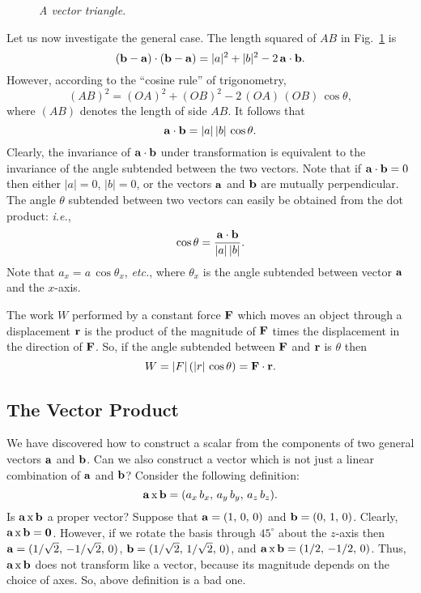\begin{figure}[h]
\epsfysize=1.75in
\centerline{}
\caption{\em A vector triangle.}\label{f5}
\end{figure}
Let us now investigate the general case. The length squared of $AB$ in Fig.~\ref{f5} is
\begin{equation}
({\bf b} - {\bf a} ) \cdot ({\bf b} - {\bf a} ) = |a|^2 + |b|^2 - 2\,{\bf a} \cdot
{\bf b}.
\end{equation}
However, according to the ``cosine rule'' of trigonometry,
\begin{equation}
(AB)^2 = (OA)^2 + (OB)^2 - 2 \,(OA)\,(OB)\,\cos\theta,
\end{equation}
where $(AB)$ denotes the length of side $AB$. It follows that
\begin{equation}
{\bf a} \cdot {\bf b} = |a|\, |b|\, \cos\theta.
\end{equation}
Clearly, the invariance of ${\bf a} \cdot {\bf b}$ under transformation is equivalent
to the invariance of the angle subtended between the two vectors. Note that
if ${\bf a} \cdot {\bf b} =0$ then either $|a|=0$, $|b|=0$, or the vectors
$\bf a$ and $\bf b$ are mutually perpendicular. The angle $\theta$ subtended between two vectors
can easily be obtained from the dot product: {\em i.e.}, 
\begin{equation}
\cos\theta = \frac{{\bf a} \cdot {\bf b}}{|a| \,|b| }.
\end{equation}
Note that $a_x=a\,\cos\theta_x$, {\em etc.}, where $\theta_x$ is
the angle subtended between vector ${\bf a}$ and the $x$-axis.

The work $W$ performed by a constant force $\bf F$ which moves an object through a displacement $\bf r$
is the product of the magnitude of $\bf F$ times the displacement in the direction
of $\bf F$. So, if the angle subtended between  $\bf F$ and $\bf r$ is $\theta$ then
\begin{equation}\label{e2.26}
W = |F| \,(|r|\,\cos\theta) = {\bf F}\cdot {\bf r}.
\end{equation}

\subsection{The Vector Product}
We have discovered how to construct a scalar from the components of two
general vectors $\bf a$ and $\bf b$. Can we also construct a vector which is not
just a linear combination of $\bf a$ and $\bf b$? Consider the following definition:
\begin{equation}
{\bf a} \,{\rm x}\, {\bf b} = (a_x \,b_x,\, a_y\, b_y,\, a_z \,b_z).
\end{equation}
Is ${\bf a} \,{\rm x}\, {\bf b}$ a proper vector? Suppose  that ${\bf a} =
(1,\,0,\,0)$ and ${\bf b} = (0,\,1,\,0)$. Clearly,  ${\bf a} \,{\rm x}\, {\bf b}= {\bf 0}$.
However, if we rotate the basis through $45^\circ$ about the $z$-axis then
${\bf a} = (1/\sqrt{2},\, -1/\sqrt{2},\, 0)$, ${\bf b} = (1/\sqrt{2},\, 1/\sqrt{2},\,0)$,
and ${\bf a}\, {\rm x}\, {\bf b} = (1/2,\, -1/2,\,0)$. Thus, ${\bf a}\, {\rm x}\, {\bf b}$ does
not transform like a vector, because its magnitude depends on the choice of axes.
So, above definition is a bad one.

